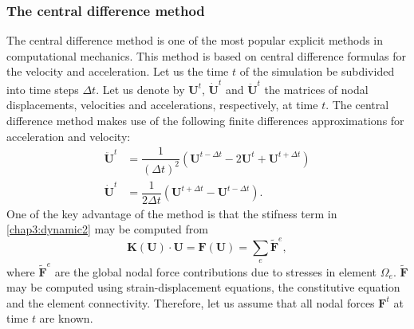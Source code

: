 		\subsubsection*{The central difference method}		\label{chap3:centralDifferenceMethod}
The central difference method is one of the most popular explicit methods in computational mechanics. This method is based on central difference formulas for the velocity and acceleration. Let us the time $ t $ of the simulation be subdivided into time steps $ \Delta t $. Let us denote by $ \mathbf{U}^t $, $ \mathbf{\dot U}^t $ and $ \mathbf{\ddot U }^t $ the matrices of nodal displacements, velocities and accelerations, respectively, at time $ t $. The central difference method makes use of the following finite differences approximations for acceleration and velocity:
\begin{align}
\mathbf{\ddot U}^t &= \dfrac{1}{(\Delta t)^2} \left( \mathbf{U}^{t-\Delta t} - 2 \mathbf{U}^{t} +\mathbf{U}^{t+\Delta t} \right) \label{chap3:accelerationApprox}\\
\mathbf{\dot U}^t &= \dfrac{1}{2 \Delta t} \left( \mathbf{U}^{t+\Delta t} - \mathbf{U}^{t-\Delta t} \right). \label{chap3:velocityApprox}
\end{align}
One of the key advantage of the method is that the stifness term in \eqref{chap3:dynamic2} may be computed from
\begin{equation}
\mathbf{K}(\mathbf{U}) \cdot \mathbf{U} = \mathbf{F}(\mathbf{U}) = \sum_e \tilde{\mathbf{F}}^e,
\end{equation}
where $ \tilde{\mathbf{F}}^e $ are the global nodal force contributions due to stresses in element $ \Omega_e $. $ \tilde{\mathbf{F}} $ may be computed using strain-displacement equations, the constitutive equation and the element connectivity. Therefore, let us assume that all nodal forces $\mathbf{F}^t $  at time $ t $ are known. 

